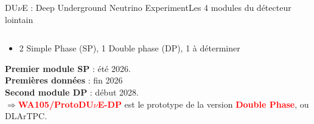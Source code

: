 \begin{frame}{DU$\nu$E : Deep Underground Neutrino Experiment}{Les 4 modules du détecteur lointain}
\begin{scriptsize}
\begin{columns}
\begin{column}{0.45\textwidth}
\begin{itemize}
                        \item 2 Simple Phase (SP), 1 Double phase (DP), 1 à déterminer
                    \end{itemize}\vspace{0.4cm}
                    \textbf{Premier module SP} : été 2026.\\
                    \textbf{Premières données} : fin 2026\\
                    \textbf{Second module DP} : début 2028.\\\vspace{0.4cm}
                    $\Rightarrow$\textcolor{red}{\textbf{WA105/ProtoDU$\nu$E-DP}} est le prototype de la version \textcolor{red}{\textbf{Double Phase}}, ou DLArTPC.\\
                \end{column}
            \end{columns}
        \end{scriptsize}
    \end{frame}
                
